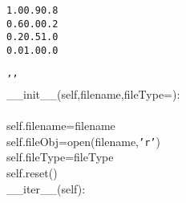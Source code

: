 {{\begin{tabbing}
{\texttt{\hspace{48pt}1.0\hspace{6pt}0.9\hspace{6pt}0.8}}\\
{\texttt{\hspace{48pt}0.6\hspace{6pt}0.0\hspace{6pt}0.2}}\\
{\texttt{\hspace{48pt}0.2\hspace{6pt}0.5\hspace{6pt}1.0}}\\
{\texttt{\hspace{48pt}0.0\hspace{6pt}1.0\hspace{6pt}0.0}}\\
\\
{\texttt{\hspace{24pt}{'}}}{\texttt{{'}{'}}}\\
\hspace{6pt}\_\_init\_\_(self,filename,fileType\hspace{6pt}=):\\
\\
\hspace{48pt}self.filename\hspace{6pt}=\hspace{6pt}filename\\
\hspace{48pt}self.fileObj\hspace{6pt}=\hspace{6pt}open(filename,{\texttt{{'}r{'}}})\\
\hspace{48pt}self.fileType\hspace{6pt}=\hspace{6pt}fileType\\
\hspace{48pt}self.reset()\\
\hspace{6pt}\_\_iter\_\_(self):\\

\end{tabbing}}}
